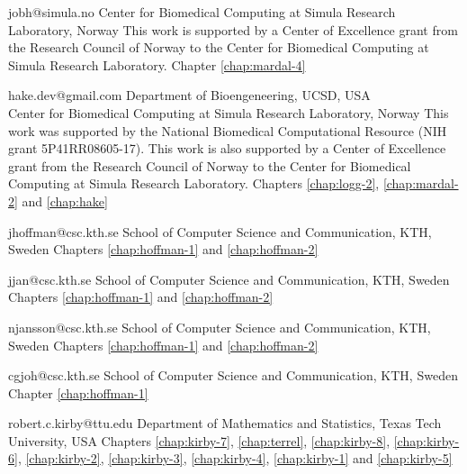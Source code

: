              {jobh@simula.no}
             {Center for Biomedical Computing at Simula Research
              Laboratory, Norway}
             {This work is supported by a Center of
              Excellence grant from the Research Council of Norway to
              the Center for Biomedical Computing at Simula Research
              Laboratory.}
             {Chapter \ref{chap:mardal-4}}

             {hake.dev@gmail.com}
             {Department of Bioengeneering, UCSD, USA\\
              Center for Biomedical Computing at Simula Research
              Laboratory, Norway}
             {This work was supported by the National Biomedical
              Computational Resource (NIH grant 5P41RR08605-17).
              This work is also supported by a Center of
              Excellence grant from the Research Council of Norway to
              the Center for Biomedical Computing at Simula Research
              Laboratory.}
             {Chapters \ref{chap:logg-2}, \ref{chap:mardal-2} and \ref{chap:hake}}

             {jhoffman@csc.kth.se}
             {School of Computer Science and Communication, KTH, Sweden}
             {}
             {Chapters \ref{chap:hoffman-1} and \ref{chap:hoffman-2}}

             {jjan@csc.kth.se}
             {School of Computer Science and Communication, KTH, Sweden}
             {}
             {Chapters \ref{chap:hoffman-1} and \ref{chap:hoffman-2}}

             {njansson@csc.kth.se}
             {School of Computer Science and Communication, KTH, Sweden}
             {}
             {Chapters \ref{chap:hoffman-1} and \ref{chap:hoffman-2}}

             {cgjoh@csc.kth.se}
             {School of Computer Science and Communication, KTH, Sweden}
             {}
             {Chapter \ref{chap:hoffman-1}}

             {robert.c.kirby@ttu.edu}
             {Department of Mathematics and Statistics, Texas Tech University, USA}
             {}
             {Chapters
              \ref{chap:kirby-7}, \ref{chap:terrel}, \ref{chap:kirby-8}, \ref{chap:kirby-6}, \ref{chap:kirby-2},
              \ref{chap:kirby-3}, \ref{chap:kirby-4}, \ref{chap:kirby-1} and \ref{chap:kirby-5}}

